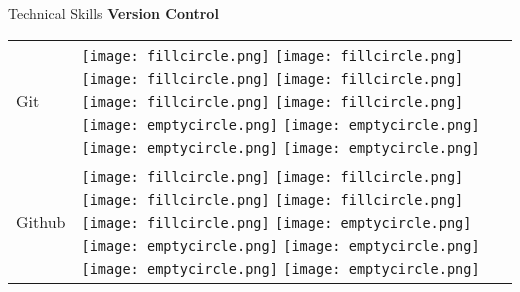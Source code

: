 \documentclass{resume}
\begin{document}
\begin{rSection}{Technical Skills}
{\bf Version Control }
\begin{table}[h!]
  \begin{tabular}{p{10cm}p{6cm}}
	Git & 
  \texttt{[image: fillcircle.png]} 
  \texttt{[image: fillcircle.png]} 
  \texttt{[image: fillcircle.png]}
  \texttt{[image: fillcircle.png]} 
  \texttt{[image: fillcircle.png]}
  \texttt{[image: fillcircle.png]} 
  \texttt{[image: emptycircle.png]}
  \texttt{[image: emptycircle.png]} 
  \texttt{[image: emptycircle.png]} 
  \texttt{[image: emptycircle.png]} \\
	Github & 
  \texttt{[image: fillcircle.png]} 
  \texttt{[image: fillcircle.png]} 
  \texttt{[image: fillcircle.png]}
  \texttt{[image: fillcircle.png]} 
  \texttt{[image: fillcircle.png]}
  \texttt{[image: emptycircle.png]} 
  \texttt{[image: emptycircle.png]}
  \texttt{[image: emptycircle.png]} 
  \texttt{[image: emptycircle.png]} 
  \texttt{[image: emptycircle.png]} \\
  \end{tabular}
\end{table}


\end{rSection}
\end{document}
